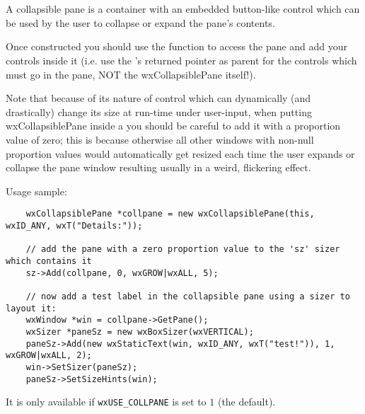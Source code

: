 
\section{}\label{wxcollapsiblepane}

A collapsible pane is a container with an embedded button-like control which can be
used by the user to collapse or expand the pane's contents.

Once constructed you should use the 
function to access the pane and add your controls inside it (i.e. use the
's returned pointer as parent for the
controls which must go in the pane, NOT the wxCollapsiblePane itself!).

Note that because of its nature of control which can dynamically (and drastically)
change its size at run-time under user-input, when putting wxCollapsiblePane inside
a  you should be careful to add it with a proportion value
of zero; this is because otherwise all other windows with non-null proportion values
would automatically get resized each time the user expands or collapse the pane window
resulting usually in a weird, flickering effect.

Usage sample:
\begin{verbatim}
    wxCollapsiblePane *collpane = new wxCollapsiblePane(this, wxID_ANY, wxT("Details:"));

    // add the pane with a zero proportion value to the 'sz' sizer which contains it
    sz->Add(collpane, 0, wxGROW|wxALL, 5);

    // now add a test label in the collapsible pane using a sizer to layout it:
    wxWindow *win = collpane->GetPane();
    wxSizer *paneSz = new wxBoxSizer(wxVERTICAL);
    paneSz->Add(new wxStaticText(win, wxID_ANY, wxT("test!")), 1, wxGROW|wxALL, 2);
    win->SetSizer(paneSz);
    paneSz->SetSizeHints(win);

\end{verbatim}


It is only available if \texttt{wxUSE\_COLLPANE} is set to $1$ (the default).

